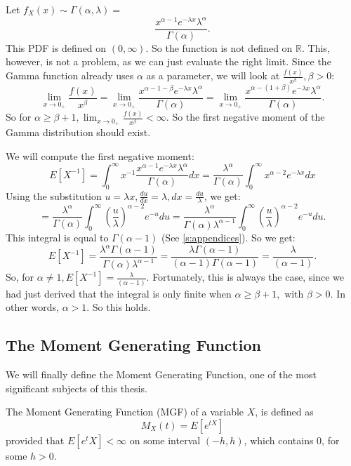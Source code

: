 \begin{example}\label{e: negative}
    Let \(f_X(x) \sim \Gamma(\alpha, \lambda) =\) 
    \[\frac{x^{\alpha -1} e^{-\lambda x} \lambda^\alpha} {\Gamma(\alpha)}.\] This PDF is defined on \((0, \infty)\). So the function is not defined on \(\mathbb{R}\). This, however, is not a problem, as we can just evaluate the right limit. Since the Gamma function already uses \(\alpha\) as a parameter, we will look at \(\frac{f(x)}{x^\beta}, \beta > 0\):
    \[\lim_{x \to 0_+} \frac{f(x)}{x^\beta} = \lim_{x \to 0_+} \frac{x^{\alpha -1 - \beta} e^{-\lambda x} \lambda^\alpha} {\Gamma(\alpha)} = \lim_{x \to 0_+} \frac{x^{\alpha -(1 + \beta)} e^{-\lambda x} \lambda^\alpha} {\Gamma(\alpha)} .\] So for \(\alpha \geq \beta + 1, \lim_{x \to 0_+} \frac{f(x)}{x^\beta} < \infty\). So the first negative moment of the Gamma distribution should exist.

    We will compute the first negative moment: 
    \[ E[X^{-1}] = \int_{0}^{\infty} x^{-1} \frac{x^{\alpha -1} e^{-\lambda x} \lambda^\alpha} {\Gamma(\alpha)} dx = \frac{\lambda^\alpha}{\Gamma(\alpha)} \int_{0}^{\infty} x^{\alpha - 2} e^{-\lambda x} dx\]
    Using the substitution \( u = \lambda x, \frac{du}{dx} = \lambda, dx = \frac{du}{\lambda}\), we get:
    \[ = \frac{\lambda^\alpha}{\Gamma(\alpha)} \int_{0}^{\infty}(\frac{u}{\lambda})^{\alpha -2} e^{-u} du = \frac{\lambda^\alpha}{\Gamma(\alpha) \lambda^{\alpha-1}} \int_{0}^{\infty}(\frac{u}{\lambda})^{\alpha -2} e^{-u} du.\] This integral is equal to \(\Gamma(\alpha - 1)\) (See \ref{s:appendices}). So we get: 
    \[E[X^{-1}] = \frac{\lambda^\alpha \Gamma(\alpha - 1) }{\Gamma(\alpha) \lambda^{\alpha-1}} = \frac{\lambda \Gamma(\alpha - 1)}{(\alpha -1)\Gamma(\alpha - 1)} = \frac{\lambda}{(\alpha -1)}.\] So, for \(\alpha \neq 1, E[X^{-1}] = \frac{\lambda}{(\alpha -1)}\). Fortunately, this is always the case, since we had just derived that the integral is only finite when \(\alpha \geq \beta + 1, \text{ with } \beta > 0\). In other words, \(\alpha > 1\). So this holds.
\end{example}
\subsection{The Moment Generating Function}
We will finally define the Moment Generating Function, one of the most significant subjects of this thesis.
\begin{definition}
    The Moment Generating Function (MGF) of a variable \(X\), is defined as
    \[M_X(t) = E[e^{tX}]\] provided that \(E[e^tX] < \infty\) on some interval \((- h, h)\), which contains 0, for some \(h > 0\).
\end{definition}

